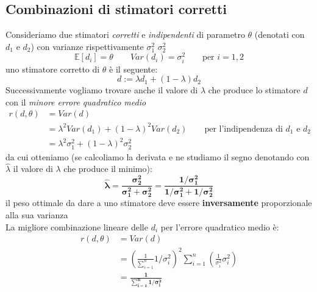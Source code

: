 \documentclass[]{article}
\newcommand{\ev}{\mathbb{E}[X]}
\renewcommand{\ev}[1]{\mathbb{E}\left[#1\right]}
\begin{document}
    \subsection{Combinazioni di stimatori corretti}
    Consideriamo due stimatori \textit{corretti} e \textit{indipendenti} di parametro $\theta$ (denotati con $d_1$ e $d_2$) con varianze rispettivamente $\sigma^2_1$ $\sigma^2_2$
    \[ \ev{d_i} = \theta \qquad Var(d_i) = \sigma^2_i \qquad \text{per } i=1,2  \]
    uno stimatore corretto di $\theta$ è il seguente:
    \[ d := \lambda d_1 + (1- \lambda) d_2 \]
    Successivamente vogliamo trovare anche il valore di $\lambda$ che produce lo stimatore $d$ con il \textit{minore errore quadratico medio}
    \begin{equation*}
        \begin{split}
            r(d, \theta) &= Var(d) \\
            &= \lambda^2 Var(d_1) + (1- \lambda)^2 Var(d_2) \qquad \text{per l'indipendenza di $d_1$ e $d_2$} \\
            &= \lambda^2 \sigma^2_1 + (1-\lambda)^2 \sigma^2_2
        \end{split}
    \end{equation*}
    da cui otteniamo (se calcoliamo la derivata e ne studiamo il segno denotando con $\hat{\lambda}$ il valore di $\lambda$ che produce il minimo):
    \[ \boldsymbol{\hat{\lambda} = \frac{\sigma^2_2}{\sigma^2_1 + \sigma^2_2} = \frac{1 / \sigma^2_1}{1 / \sigma^2_1 + 1 / \sigma^2_2}} \]
    il peso ottimale da dare a uno stimatore deve essere \textbf{inversamente} proporzionale alla sua varianza \\
    La migliore combinazione lineare delle $d_i$ per l'errore quadratico medio è:
    \begin{equation*}
        \begin{split}
            r(d, \theta) &= Var(d) \\
            &= \left( \frac{1}{\sum_{i=1}^{n}} 1 / \sigma^2_i \right)^2 \sum_{i=1}^{n} \left( \frac{1}{\sigma^2_i} \sigma^2_i \right) \\
            &= \boldsymbol{\frac{1}{\sum_{i=1}^{n} 1 / \sigma^2_i}}
        \end{split}
    \end{equation*}
\end{document}
